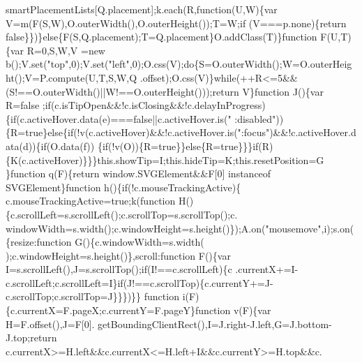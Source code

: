 \begin{DoxyCode}
{      smartPlacementLists[Q.placement];k.each(R,\textcolor{keyword}{function}(U,W)\{var V=m(F(S,W),O.outerWidth(),O.outerHeight());T=W;\textcolor{keywordflow}{if}
      (V===p.none)\{\textcolor{keywordflow}{return} \textcolor{keyword}{false}\}\})\}\textcolor{keywordflow}{else}\{F(S,Q.placement);T=Q.placement\}O.addClass(T)\}\textcolor{keyword}{function} F(U,T)\{var R=0,S,W,V
      =\textcolor{keyword}{new} b();V.set(\textcolor{stringliteral}{"top"},0);V.set(\textcolor{stringliteral}{"left"},0);O.css(V);\textcolor{keywordflow}{do}\{S=O.outerWidth();W=O.outerHeight();V=P.compute(U,T,S,W,Q
      .offset);O.css(V)\}\textcolor{keywordflow}{while}(++R<=5&&(S!==O.outerWidth()||W!==O.outerHeight()));\textcolor{keywordflow}{return} V\}\textcolor{keyword}{function} J()\{var R=\textcolor{keyword}{false}
      ;\textcolor{keywordflow}{if}(c.isTipOpen&&!c.isClosing&&!c.delayInProgress)\{\textcolor{keywordflow}{if}(c.activeHover.data(e)===\textcolor{keyword}{false}||c.activeHover.is(\textcolor{stringliteral}{"
      :disabled"}))\{R=\textcolor{keyword}{true}\}\textcolor{keywordflow}{else}\{\textcolor{keywordflow}{if}(!v(c.activeHover)&&!c.activeHover.is(\textcolor{stringliteral}{":focus"})&&!c.activeHover.data(d))\{\textcolor{keywordflow}{if}(O.data(f))
      \{\textcolor{keywordflow}{if}(!v(O))\{R=\textcolor{keyword}{true}\}\}\textcolor{keywordflow}{else}\{R=\textcolor{keyword}{true}\}\}\}\textcolor{keywordflow}{if}(R)\{K(c.activeHover)\}\}\}this.showTip=I;this.hideTip=K;this.resetPosition=G
      \}\textcolor{keyword}{function} q(F)\{\textcolor{keywordflow}{return} window.SVGElement&&F[0] instanceof SVGElement\}\textcolor{keyword}{function} h()\{\textcolor{keywordflow}{if}(!c.mouseTrackingActive)\{
      c.mouseTrackingActive=\textcolor{keyword}{true};k(\textcolor{keyword}{function} H()\{c.scrollLeft=s.scrollLeft();c.scrollTop=s.scrollTop();c.
      windowWidth=s.width();c.windowHeight=s.height()\});A.on(\textcolor{stringliteral}{"mousemove"},i);s.on(\{resize:\textcolor{keyword}{function} G()\{c.windowWidth=s.width(
      );c.windowHeight=s.height()\},scroll:\textcolor{keyword}{function} F()\{var I=s.scrollLeft(),J=s.scrollTop();\textcolor{keywordflow}{if}(I!==c.scrollLeft)\{c
      .currentX+=I-c.scrollLeft;c.scrollLeft=I\}\textcolor{keywordflow}{if}(J!==c.scrollTop)\{c.currentY+=J-c.scrollTop;c.scrollTop=J\}\}\})\}\}\textcolor{keyword}{
      function} i(F)\{c.currentX=F.pageX;c.currentY=F.pageY\}\textcolor{keyword}{function} v(F)\{var H=F.offset(),J=F[0].
      getBoundingClientRect(),I=J.right-J.left,G=J.bottom-J.top;\textcolor{keywordflow}{return} c.currentX>=H.left&&c.currentX<=H.left+I&&c.currentY>=H.top&&c.
}
\end{DoxyCode}
